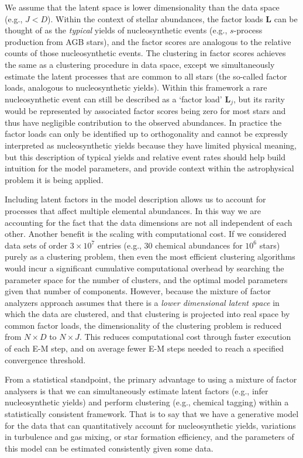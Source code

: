 \documentclass[twocolumn]{aastex61}
\newcommand{\factorloads}{\textbf{L}}
\newcommand{\NumDimensions}{D}
\newcommand{\NumLatentFactors}{J}
\newcommand{\numlatentfactors}{j}
\begin{document}
We assume that the latent space is lower dimensionality than the
data space (e.g., $\NumLatentFactors < \NumDimensions$).
Within the context of stellar abundances, the factor loads
$\factorloads$ can be thought of as the \emph{typical} yields
of nucleosynthetic
events (e.g., $s$-process production from AGB stars), and the
factor scores are analogous to the relative counts of those 
nucleosynthetic events. The clustering in factor scores
achieves the same as a clustering procedure in data space,
except we simultaneously estimate the latent processes that are
common to all stars (the so-called factor loads, analogous to 
nucleosynthetic yields). Within this framework a rare nucleosynthetic event
can still be described as a `factor load' $\factorloads_\numlatentfactors$, 
but its rarity would be represented by associated factor
scores being zero for most stars and thus have negligible contribution
to the observed abundances. In practice the factor loads can only be 
identified up to orthogonality and cannot be expressly interpreted as
nucleosynthetic yields because they have limited physical meaning,
but this description of typical yields and relative event rates should
help build intuition for the model parameters, and provide context
within the astrophysical problem it is being applied.


Including latent factors in the model description allows us to account for 
processes that affect multiple elemental abundances. In this way we are 
accounting for the fact that the data dimensions are not all independent of
each other. Another benefit is the scaling with computational cost. If we 
considered data sets of order $3\times10^7$
entries (e.g., 30 chemical abundances for $10^6$ stars) purely as a
clustering problem, then even the most efficient clustering
algorithms would incur a significant cumulative computational 
overhead by searching the parameter space for the number of
clusters, and the optimal model parameters given that number
of components. However, because the mixture of factor analyzers
approach assumes that there is a \emph{lower dimensional latent 
space} in which the data are clustered, and that clustering is 
projected into real space by common factor loads, the 
dimensionality of the clustering problem is reduced from 
$N \times D$ to $N \times J$. This reduces computational cost through
faster execution of each E-M step, and on average fewer E-M steps
needed to reach a specified convergence threshold.

From a statistical standpoint, the primary advantage to using
a mixture of factor analysers is that we can simultaneously
estimate latent factors (e.g., infer nucleosynthetic 
yields) and perform clustering (e.g., chemical tagging) 
within a statistically consistent framework. That is to say
that we have a generative model for the data that can 
quantitatively account for nucleosynthetic yields, variations in
turbulence and gas mixing, or star formation efficiency,
and the parameters of this model can be estimated consistently
given some data.
\end{document}
